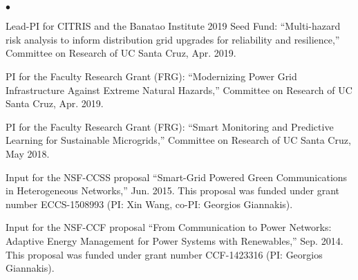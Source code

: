\documentclass[margin,line]{res}
\newenvironment{list2}{
  \begin{list}{$\bullet$}{%
      \setlength{\itemsep}{0in}
      \setlength{\parsep}{0in} \setlength{\parskip}{0in}
      \setlength{\topsep}{0in} \setlength{\partopsep}{0in}
      \setlength{\leftmargin}{0.10in}}}{\end{list}}
\begin{document}
\begin{resume}
\begin{enumerate}
\end{enumerate}

\vspace{.3cm}


\section{}
\begin{list2}

\item  Lead-PI for CITRIS and the Banatao Institute 2019 Seed Fund: ``Multi-hazard risk analysis to inform distribution grid upgrades for reliability and resilience,'' Committee on Research of UC Santa Cruz, Apr. 2019.

\item  PI for the Faculty Research Grant (FRG): ``Modernizing Power Grid Infrastructure Against Extreme Natural Hazards,'' Committee on Research of UC Santa Cruz, Apr. 2019.

\item  PI for the Faculty Research Grant (FRG): ``Smart Monitoring and Predictive Learning for Sustainable Microgrids,'' Committee on Research of UC Santa Cruz, May 2018.




\item   Input for the NSF-CCSS proposal ``Smart-Grid Powered Green Communications
        in Heterogeneous Networks,'' Jun. 2015.
        This proposal was funded under grant number ECCS-1508993 (PI: Xin Wang, co-PI: Georgios Giannakis).

\item   Input for the NSF-CCF proposal ``From Communication to Power Networks:
        Adaptive Energy Management for Power Systems with Renewables,'' Sep. 2014.
        This proposal was funded under grant number CCF-1423316 (PI: Georgios Giannakis).


\end{list2}
\end{resume}
\end{document}
